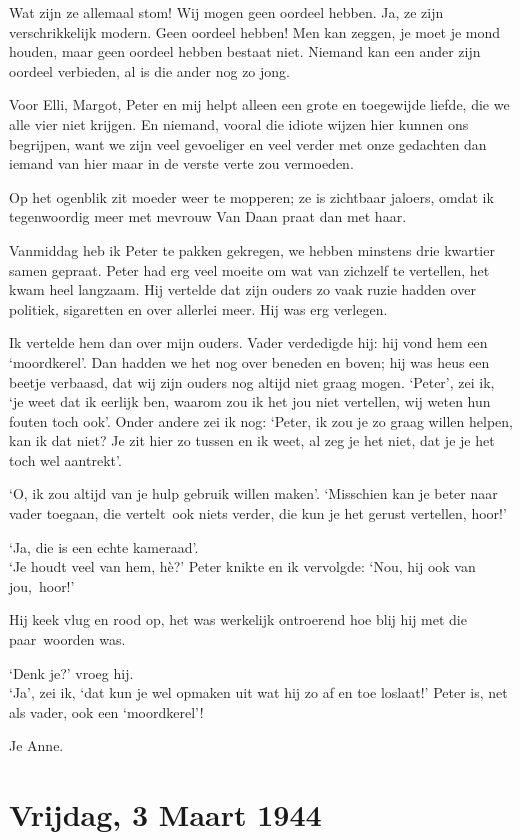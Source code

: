 \documentclass{book}
\begin{document}
Wat zijn ze allemaal stom! Wij mogen geen oordeel hebben. Ja, ze zijn
verschrikkelijk modern. Geen oordeel hebben! Men kan zeggen, je moet je mond
houden, maar geen oordeel hebben bestaat niet. Niemand kan een ander zijn
oordeel verbieden, al is die ander nog zo jong.

Voor Elli, Margot, Peter en mij helpt alleen een grote en toegewijde liefde, die
we alle vier niet krijgen. En niemand, vooral die idiote wijzen hier kunnen ons
begrijpen, want we zijn veel gevoeliger en veel verder met onze gedachten dan
iemand van hier maar in de verste verte zou vermoeden.

Op het ogenblik zit moeder weer te mopperen; ze is zichtbaar jaloers, omdat ik
tegenwoordig meer met mevrouw Van Daan praat dan met haar.

Vanmiddag heb ik Peter te pakken gekregen, we hebben minstens drie kwartier
samen gepraat. Peter had erg veel moeite om wat van zichzelf te vertellen, het
kwam heel langzaam. Hij vertelde dat zijn ouders zo vaak ruzie hadden over
politiek, sigaretten en over allerlei meer. Hij was erg verlegen.

Ik vertelde hem dan over mijn ouders. Vader verdedigde hij: hij vond hem een
`moordkerel'. Dan hadden we het nog over beneden en boven; hij was heus een
beetje verbaasd, dat wij zijn ouders nog altijd niet graag mogen. `Peter', zei
ik, `je weet dat ik eerlijk ben, waarom zou ik het jou niet vertellen, wij weten
hun fouten toch ook'. Onder andere zei ik nog: `Peter, ik zou je zo graag willen
helpen, kan ik dat niet? Je zit hier zo tussen en ik weet, al zeg je het niet,
dat je je het toch wel aantrekt'.

`O, ik zou altijd van je hulp gebruik willen maken'. `Misschien kan je beter
naar vader toegaan, die vertelt~ook niets verder, die kun je het gerust
vertellen, hoor!'

`Ja, die is een echte kameraad'.\\
`Je houdt veel van hem, hè?' Peter knikte en
ik vervolgde: `Nou, hij ook van jou,~hoor!'

Hij keek vlug en rood op, het was werkelijk ontroerend hoe blij hij met die
paar~woorden was.

`Denk je?' vroeg hij.\\
`Ja', zei ik, `dat kun je wel opmaken uit wat hij zo af
en toe loslaat!' Peter is, net als vader, ook een `moordkerel'!

Je Anne.

\section*{Vrijdag, 3 Maart 1944}
\end{document}
